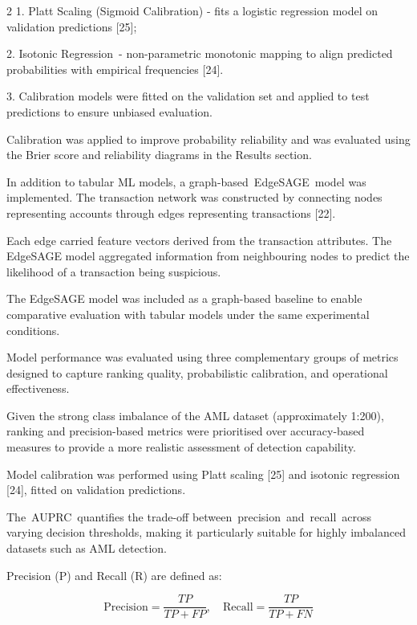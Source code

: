 \begin{multicols}{2}
1. Platt Scaling (Sigmoid Calibration) - fits a logistic
regression model on validation predictions {[}25{]};

2. Isotonic Regression~- non-parametric monotonic mapping to align
predicted probabilities with empirical frequencies {[}24{]}.

3. Calibration models were fitted on the validation set and applied to
test predictions to ensure unbiased evaluation.

Calibration was applied to improve probability reliability and was
evaluated using the Brier score and reliability diagrams in the Results
section.

In addition to tabular ML models, a graph-based~EdgeSAGE~model
was implemented. The transaction network was constructed by connecting
nodes representing accounts through edges representing transactions
{[}22{]}.

Each edge carried feature vectors derived from the transaction
attributes. The EdgeSAGE model aggregated information from neighbouring
nodes to predict the likelihood of a transaction being suspicious.

The EdgeSAGE model was included as a graph-based baseline to enable
comparative evaluation with tabular models under the same experimental
conditions.

Model performance was evaluated using three complementary groups of
metrics designed to capture ranking quality, probabilistic calibration,
and operational effectiveness.

Given the strong class imbalance of the AML dataset (approximately
1:200), ranking and precision-based metrics were prioritised over
accuracy-based measures to provide a more realistic assessment of
detection capability.

Model calibration was performed using Platt scaling {[}25{]} and
isotonic regression {[}24{]}, fitted on validation predictions.

The~AUPRC~quantifies the trade-off between~precision~and~recall~across
varying decision thresholds, making it particularly suitable for highly
imbalanced datasets such as AML detection.

Precision (P) and Recall (R) are defined as:
\end{multicols}
\vspace{-1em}
\begin{equation}
\text{Precision} = \frac{TP}{TP + FP}, \quad \text{Recall} = \frac{TP}{TP + FN}
\end{equation}

